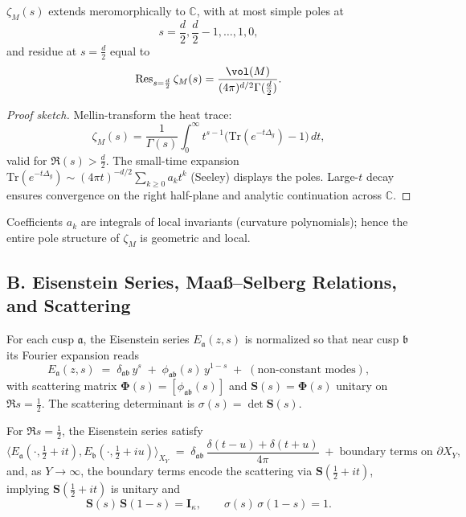 \begin{theorem}
\label{thm:zetaM-cont-expanded}
$\zeta_M(s)$ extends meromorphically to $\mathbb C$, with at most simple poles at
\[
  s=\frac d2,\frac d2-1,\ldots,1,0,
\]
and residue at $s=\tfrac d2$ equal to
\[
  \operatorname{Res}_{s=\frac d2}\zeta_M(s)=\frac{\vol(M)}{(4\pi)^{d/2}\Gamma(\tfrac d2)}.
\]
\end{theorem}

\begin{proof}[Proof sketch]
Mellin-transform the heat trace:
\[
  \zeta_M(s)=\frac{1}{\Gamma(s)}\int_0^\infty t^{s-1}\Big(\mathrm{Tr}(e^{-t\Delta_g})-1\Big)\,dt,
\]
valid for $\Re(s)>\tfrac d2$. The small-time expansion $\mathrm{Tr}(e^{-t\Delta_g})\sim (4\pi t)^{-d/2}\sum_{k\ge0}a_k t^k$ (Seeley) displays the poles. Large-$t$ decay ensures convergence on the right half-plane and analytic continuation across $\mathbb C$.
\end{proof}

\begin{remark}
Coefficients $a_k$ are integrals of local invariants (curvature polynomials); hence the entire pole structure of $\zeta_M$ is geometric and local.
\end{remark}


\subsection*{B. Eisenstein Series, Maaß–Selberg Relations, and Scattering}
\label{subsec:eisenstein-scattering-expanded}

\begin{definition}
\label{def:eisenstein-norm}
For each cusp $\mathfrak a$, the Eisenstein series $E_{\mathfrak a}(z,s)$ is normalized so that near cusp $\mathfrak b$ its Fourier expansion reads
\[
  E_{\mathfrak a}(z,s)\;=\;\delta_{\mathfrak a\mathfrak b}\,y^{s} \;+\; \phi_{\mathfrak a\mathfrak b}(s)\,y^{1-s} \;+\; (\text{non-constant modes}),
\]
with scattering matrix $\mathbf \Phi(s)=[\phi_{\mathfrak a\mathfrak b}(s)]$ and $\mathbf S(s)=\mathbf \Phi(s)$ unitary on $\Re s=\tfrac12$. The scattering determinant is $\sigma(s)=\det \mathbf S(s)$.
\end{definition}

\begin{theorem}
\label{thm:maass-selberg}
For $\Re s=\tfrac12$, the Eisenstein series satisfy
\[
  \langle E_{\mathfrak a}(\cdot,\tfrac12+it), E_{\mathfrak b}(\cdot,\tfrac12+iu)\rangle_{X_Y}
  \;=\; \delta_{\mathfrak a\mathfrak b}\,\frac{\delta(t-u)+\delta(t+u)}{4\pi} \;+\; \text{boundary terms on } \partial X_Y,
\]
and, as $Y\to\infty$, the boundary terms encode the scattering via $\mathbf S(\tfrac12+it)$, implying $\mathbf S(\tfrac12+it)$ is unitary and
\[
  \mathbf S(s)\,\mathbf S(1-s)=\mathbf I_\kappa,\qquad \sigma(s)\,\sigma(1-s)=1.
\]
\end{theorem}

